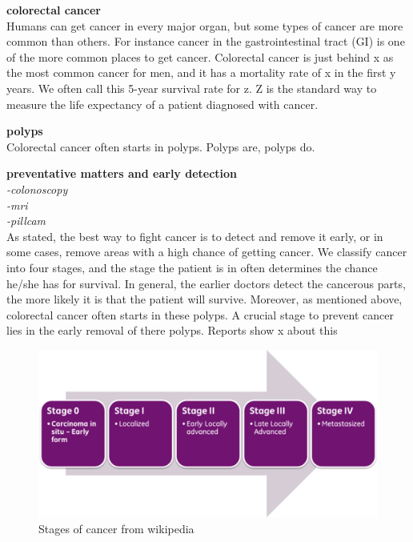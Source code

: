 \textbf{colorectal cancer}\\
Humans can get cancer in every major organ, but some types of cancer are more common than others.    
For instance cancer in the gastrointestinal tract (GI) is one of the more common places to get cancer. Colorectal cancer is just behind x as the most common cancer for men, and it has a mortality rate of x in the first y years. %
We often call this 5-year survival rate for z. Z is the standard way to measure the life expectancy of a patient diagnosed with cancer. 
    

\textbf{polyps}\\
Colorectal cancer often starts in polyps. 
Polyps are, polyps do.
    
\textbf{preventative matters and early detection}\\
    \textit{-colonoscopy\\ 
        -mri\\
        -pillcam\\}
    As stated, the best way to fight cancer is to detect and remove it early, or in some cases, remove areas with a high chance of getting cancer.
    We classify cancer into four stages, and the stage the patient is in often determines the chance he/she has for survival. 
    In general, the earlier doctors detect the cancerous parts, the more likely it is that the patient will survive. 
    Moreover, as mentioned above, colorectal cancer often starts in these polyps. A crucial stage to prevent cancer lies in the 
    early removal of there polyps.
    Reports show x about this %
    
    \begin{figure}[t]
        \centering
        \includegraphics[scale=1.2]{introduction/figures/Cancer_stages.png}
        \caption{Stages of cancer from wikipedia} 
    \end{figure}

